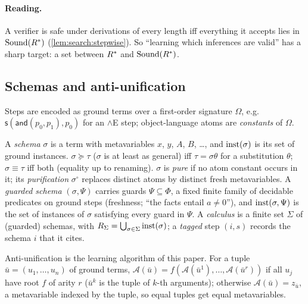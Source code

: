 \paragraph{Reading.} A verifier is safe under derivations of every length iff
everything it accepts lies in $\mathrm{Sound}(R^{*})$ (\cref{lem:search:stepwise}). So
``learning which inferences are valid'' has a sharp target: a set between
$R^{*}$ and $\mathrm{Sound}(R^{*})$.

\subsection{Schemas and anti-unification}\label{sec:setting:schemas}

Steps are encoded as ground terms over a first-order signature $\Omega$, e.g.\
$\mathsf{s}(\mathsf{and}(p_0,p_1),p_0)$ for an $\wedge$E step; object-language
atoms are \emph{constants} of $\Omega$.

\begin{definition}[Schemas]\label{def:setting:schema}
A \emph{schema} $\sigma$ is a term with metavariables $x$, $y$, $A$, $B$, \dots, and
$\mathrm{inst}(\sigma)$ is its set of ground instances. $\sigma\succeq\tau$ ($\sigma$ is
at least as general) iff $\tau=\sigma\theta$ for a substitution $\theta$;
$\sigma\equiv\tau$ iff both (equality up to renaming). $\sigma$ is \emph{pure} if
no atom constant occurs in it; its \emph{purification} $\sigma^\circ$ replaces
distinct atoms by distinct fresh metavariables. A \emph{guarded schema}
$(\sigma,\Psi)$ carries guards $\Psi\subseteq\Phi$, a fixed finite family of
decidable predicates on ground steps (freshness; ``the facts entail $a\neq0$''),
and $\mathrm{inst}(\sigma,\Psi)$ is the set of instances of $\sigma$ satisfying every
guard in $\Psi$. A
\emph{calculus} is a finite set $\Sigma$ of (guarded) schemas, with
$R_\Sigma=\bigcup_{\sigma\in\Sigma}\mathrm{inst}(\sigma)$; a \emph{tagged} step $(i,s)$
records the schema $i$ that it cites.
\end{definition}

Anti-unification is the learning algorithm of this paper. For a tuple
$\bar u=(u_1,\dots,u_n)$ of ground terms, $\mathcal A(\bar u)=f(\mathcal A(\bar
u^1),\dots,\mathcal A(\bar u^r))$ if all $u_j$ have root $f$ of arity $r$
($\bar u^k$ is the tuple of $k$-th arguments); otherwise $\mathcal A(\bar
u)=z_{\bar u}$, a metavariable indexed by the tuple, so equal tuples get equal
metavariables.

